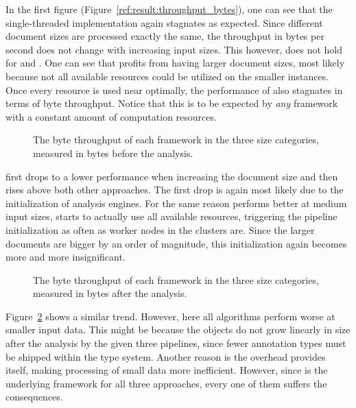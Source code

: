 In the first figure (Figure~\ref{ref:result:throughput_bytes}), one can see that the single-threaded implementation again stagnates as expected. Since different document sizes are processed exactly the same, the throughput in bytes per second does not change with increasing input sizes. This however, does not hold for \uimaas{} and \spark{}. One can see that \uimaas{} profits from having larger document sizes, most likely because not all available resources could be utilized on the smaller instances. Once every resource is used near optimally, the performance of \uimaas{} also stagnates in terms of byte throughput. Notice that this is to be expected by \emph{any} framework with a constant amount of computation resources.
\begin{figure}[htb]
	\centering
	\resizebox{1.\linewidth}{!}{\small}
	\caption{The byte throughput of each framework in the three size categories, measured in bytes before the analysis.}
	\label{fig:result:throughput_bytes}
\end{figure}
\spark{} first drops to a lower performance when increasing the document size and then rises above both other approaches. The first drop is again most likely due to the initialization of analysis engines. For the same reason \uimaas{} performs better at medium input sizes, \spark{} starts to actually use all available resources, triggering the pipeline initialization as often as worker nodes in the \spark{} clusters are. Since the larger documents are bigger by an order of magnitude, this initialization again becomes more and more insignificant.
\begin{figure}[htb]
	\centering
	\resizebox{1.\linewidth}{!}{\small}
	\caption{The byte throughput of each framework in the three size categories, measured in bytes after the analysis.}
	\label{fig:result:throughput_bytes_after}
\end{figure}
Figure~\ref{fig:result:throughput_bytes_after} shows a similar trend. However, here all algorithms perform worse at smaller input data. This might be because the \cas{} objects do not grow linearly in size after the analysis by the given three pipelines, since fewer annotation types must be shipped within the type system. Another reason is the overhead \uima{} provides itself, making processing of small data more inefficient. However, since \uima{} is the underlying framework for all three approaches, every one of them suffers the consequences.




